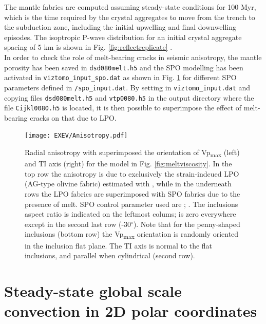 The mantle fabrics are computed assuming steady-state conditions for 100 Myr, which is the time required by the crystal aggregates to move from the trench to the subduction zone, including the initial upwelling and final downwelling episodes.
The isoptropic P-wave distribution for an initial crystal aggregate spacing of 5 km is shown in Fig. \ref{fig:reflectreplicate} .\\

In order to check the role of melt-bearing cracks in seismic anisotropy, the mantle porosity has been saved in \texttt{dsd080melt.h5} and the SPO modelling has been activated in \texttt{viztomo\_input\_spo.dat} as shown in Fig. \ref{fig:extrinsic_anisotropy} for different SPO parameters defined in \texttt{\viztomotitle{}/spo\_input.dat}. 
By setting  in \texttt{viztomo\_input.dat} and copying files \texttt{dsd080melt.h5} and \texttt{vtp0080.h5} in the output directory where the file \texttt{Cijkl0080.h5} is located, it is then possible to superimpose the effect of melt-bearing cracks on that due to LPO.


\begin{figure}
    \centering
    \texttt{[image: EXEV/Anisotropy.pdf]}
    \caption{Radial anisotropy with superimposed the orientation of Vp\textsubscript{max} (left) and TI axis (right) for the model in Fig. \ref{fig:meltviscosity}. In the top row the anisotropy is due to exclusively the strain-indcued LPO (AG-type olivine fabric) estimated with \drexmtitle{}, while in the underneath rows the LPO fabrics are superimposed with SPO fabrics due to the presence of melt. SPO control parameter used are ; . The inclusions aspect ratio is indicated on the leftmost colums;  is zero everywhere except in the second last row (-30$^{\circ}$). Note that for the penny-shaped inclusions (bottom row) the Vp\textsubscript{max} orientation is randomly oriented in the inclusion flat plane. The TI axis is normal to the flat inclusions, and parallel when cylindrical (second row).
    }
    \label{fig:extrinsic_anisotropy}
\end{figure}

\vfill %

\section{Steady-state global scale convection in 2D polar coordinates}
\label{section:cookbook_2Dconvection}

